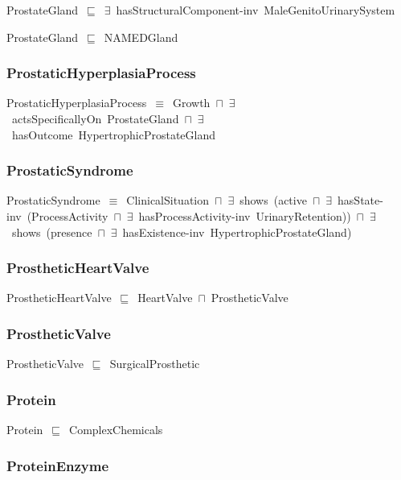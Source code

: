 \documentclass{article}
\begin{document}
ProstateGland~\ensuremath{\sqsubseteq}~\ensuremath{\exists}~hasStructuralComponent-inv~MaleGenitoUrinarySystem~

ProstateGland~\ensuremath{\sqsubseteq}~NAMEDGland~

\subsubsection*{ProstaticHyperplasiaProcess}

ProstaticHyperplasiaProcess~\ensuremath{\equiv}~Growth~\ensuremath{\sqcap}~\ensuremath{\exists}~actsSpecificallyOn~ProstateGland~\ensuremath{\sqcap}~\ensuremath{\exists}~hasOutcome~HypertrophicProstateGland

\subsubsection*{ProstaticSyndrome}

ProstaticSyndrome~\ensuremath{\equiv}~ClinicalSituation~\ensuremath{\sqcap}~\ensuremath{\exists}~shows~(active~\ensuremath{\sqcap}~\ensuremath{\exists}~hasState-inv~(ProcessActivity~\ensuremath{\sqcap}~\ensuremath{\exists}~hasProcessActivity-inv~UrinaryRetention))~\ensuremath{\sqcap}~\ensuremath{\exists}~shows~(presence~\ensuremath{\sqcap}~\ensuremath{\exists}~hasExistence-inv~HypertrophicProstateGland)

\subsubsection*{ProstheticHeartValve}

ProstheticHeartValve~\ensuremath{\sqsubseteq}~HeartValve~\ensuremath{\sqcap}~ProstheticValve~

\subsubsection*{ProstheticValve}

ProstheticValve~\ensuremath{\sqsubseteq}~SurgicalProsthetic~

\subsubsection*{Protein}

Protein~\ensuremath{\sqsubseteq}~ComplexChemicals~

\subsubsection*{ProteinEnzyme}
\end{document}
